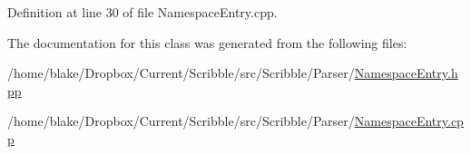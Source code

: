 Definition at line 30 of file Namespace\-Entry.\-cpp.



The documentation for this class was generated from the following files\-:\begin{DoxyCompactItemize}
\item 
/home/blake/\-Dropbox/\-Current/\-Scribble/src/\-Scribble/\-Parser/\hyperlink{_namespace_entry_8hpp}{Namespace\-Entry.\-hpp}\item 
/home/blake/\-Dropbox/\-Current/\-Scribble/src/\-Scribble/\-Parser/\hyperlink{_namespace_entry_8cpp}{Namespace\-Entry.\-cpp}\end{DoxyCompactItemize}
